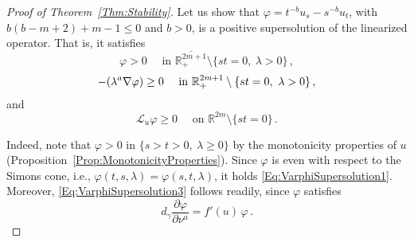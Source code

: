 \documentclass[twoside,leqno,symbols-for-thanks, draft]{rmi}
\numberwithin{equation}{section}
\theoremstyle{definition}
\newcommand{\con}[1]{\mathbb{#1}}
\newcommand{\R}{\con{R}} %
\newcommand{\s}{\gamma}
\let\div\relax
\DeclareMathOperator{\div}{div}
\begin{document}
\begin{proof}[Proof of Theorem~\ref{Thm:Stability}]
	
	Let us show that $\varphi = t^{-b}u_s - s^{-b}u_t$, with $b(b-m+2)+m-1\leq 0$ and $b>0$, is a positive supersolution of the linearized operator. That is, it satisfies 
	\begin{equation}
	\label{Eq:VarphiSupersolution1}
	\varphi>0 \quad \text{ in } \overline{\R^{2m+1}_+}\setminus \{st=0, \ \lambda >0\}\,,
	\end{equation} 
	\begin{equation}
	\label{Eq:VarphiSupersolution2}
	-\div(\lambda^a \nabla \varphi) \geq 0 \quad \text{ in } \R^{2m+1}_+\setminus \{st=0, \ \lambda >0\}\,,
	\end{equation} 
	and  
	\begin{equation}
	\label{Eq:VarphiSupersolution3}
	\mathscr{L}_u \varphi \geq 0 \quad \text{ on } \R^{2m}  \setminus \{st=0\}\,.
	\end{equation} 
	
	Indeed, note that $\varphi>0$ in $\{s>t>0, \ \lambda \geq0\}$ by the monotonicity properties of $u$ (Proposition~\ref{Prop:MonotonicityProperties}). Since $\varphi$ is even with respect to the Simons cone, i.e., $ \varphi(t,s,\lambda) = \varphi(s,t,\lambda)$, it holds \eqref{Eq:VarphiSupersolution1}. Moreover, \eqref{Eq:VarphiSupersolution3} follows readily, since $\varphi$  satisfies 
	$$ 
	d_\s \frac{\partial \varphi}{\partial \nu^a} = f'(u)\,\varphi\,. 
	$$
	

\end{proof}
\end{document}
